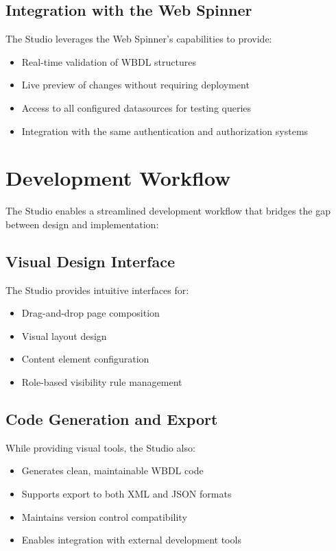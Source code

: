 \subsection{Integration with the Web Spinner}

The Studio leverages the Web Spinner's capabilities to provide:

\begin{itemize}
\item Real-time validation of WBDL structures
\item Live preview of changes without requiring deployment
\item Access to all configured datasources for testing queries
\item Integration with the same authentication and authorization systems
\end{itemize}

\section{Development Workflow}

The Studio enables a streamlined development workflow that bridges the gap between design and implementation:

\subsection{Visual Design Interface}

The Studio provides intuitive interfaces for:

\begin{itemize}
\item Drag-and-drop page composition
\item Visual layout design
\item Content element configuration
\item Role-based visibility rule management
\end{itemize}

\subsection{Code Generation and Export}

While providing visual tools, the Studio also:

\begin{itemize}
\item Generates clean, maintainable WBDL code
\item Supports export to both XML and JSON formats
\item Maintains version control compatibility
\item Enables integration with external development tools
\end{itemize}

